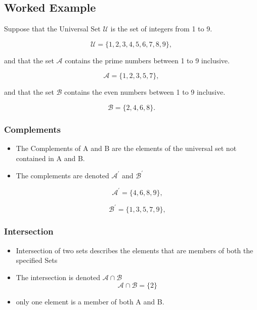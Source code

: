 
\subsection*{Worked Example}

Suppose that the Universal Set $\mathcal{U}$ is the set of integers from 1 to 9.

\[ \mathcal{U} = \{1,2,3,4,5,6,7,8,9\}, \]

and that the set $\mathcal{A}$ contains the prime numbers between 1 to 9 inclusive.


\[ \mathcal{A} = \{1,2,3,5,7\}, \]


and that the set $\mathcal{B}$ contains the even numbers between 1 to 9 inclusive.


\[ \mathcal{B} = \{2,4,6,8\}. \]



\subsubsection*{Complements}

\begin{itemize}


\item The Complements of A and B are the elements of the universal set not contained in A and B.


\item The complements are denoted $\mathcal{A}^{\prime}$ and $\mathcal{B}^{\prime}$

\[ \mathcal{A}^{\prime} = \{4,6,8,9\}, \]


\[ \mathcal{B}^{\prime} = \{1,3,5,7,9\}, \]


\end{itemize}






\subsubsection*{Intersection}
\begin{itemize}


\item Intersection of two sets describes the elements that are members of both the specified Sets


\item The intersection is denoted $\mathcal{A\cap B}$ 
\[ \mathcal{A\cap B} = \{2\}\]


\item only one element is a member of both A and B.

\end{itemize}

